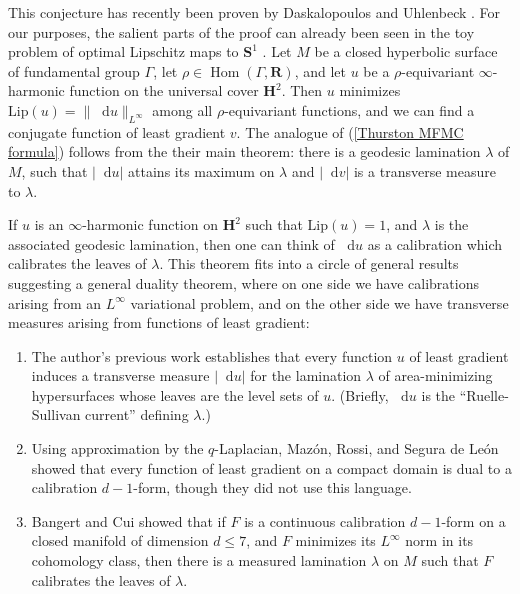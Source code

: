 \documentclass[reqno,11pt]{amsart}
\newcommand{\RR}{\mathbf{R}}
\newcommand{\Hyp}{\mathbf H}
\newcommand{\Sph}{\mathbf S}
\newcommand*\dif{\mathop{}\!\mathrm{d}}
\DeclareMathOperator{\Hom}{Hom}
\newcommand{\Lip}{\mathrm{Lip}}
\theoremstyle{definition}
\numberwithin{equation}{section}
\begin{document}
This conjecture has recently been proven by Daskalopoulos and Uhlenbeck \cite{daskalopoulos2022,uhlenbeck2023noether,daskalopoulos2023}.
For our purposes, the salient parts of the proof can already been seen in the toy problem of optimal Lipschitz maps to $\Sph^1$ \cite{daskalopoulos2020transverse}.
Let $M$ be a closed hyperbolic surface of fundamental group $\Gamma$, let $\rho \in \Hom(\Gamma, \RR)$, and let $u$ be a $\rho$-equivariant $\infty$-harmonic function on the universal cover $\Hyp^2$.
Then $u$ minimizes $\Lip(u) = \|\dif u\|_{L^\infty}$ among all $\rho$-equivariant functions, and we can find a conjugate function of least gradient $v$.
The analogue of (\ref{Thurston MFMC formula}) follows from the their main theorem: there is a geodesic lamination $\lambda$ of $M$, such that $|\dif u|$ attains its maximum on $\lambda$ and $|\dif v|$ is a transverse measure to $\lambda$.

If $u$ is an $\infty$-harmonic function on $\Hyp^2$ such that $\Lip(u) = 1$, and $\lambda$ is the associated geodesic lamination, then one can think of $\dif u$ as a calibration which calibrates the leaves of $\lambda$.
This theorem fits into a circle of general results suggesting a general duality theorem, where on one side we have calibrations arising from an $L^\infty$ variational problem, and on the other side we have transverse measures arising from functions of least gradient:
\begin{enumerate}
\item The author's previous work \cite{BackusCML} establishes that every function $u$ of least gradient induces a transverse measure $|\dif u|$ for the lamination $\lambda$ of area-minimizing hypersurfaces whose leaves are the level sets of $u$.
(Briefly, $\dif u$ is the ``Ruelle-Sullivan current'' defining $\lambda$.)
\item Using approximation by the $q$-Laplacian, Maz\'on, Rossi, and Segura de Le\'on \cite{Mazon14} showed that every function of least gradient on a compact domain is dual to a calibration $d - 1$-form, though they did not use this language.
\item Bangert and Cui \cite{bangert_cui_2017} showed that if $F$ is a continuous calibration $d - 1$-form on a closed manifold of dimension $d \leq 7$, and $F$ minimizes its $L^\infty$ norm in its cohomology class, then there is a measured lamination $\lambda$ on $M$ such that $F$ calibrates the leaves of $\lambda$.
\end{enumerate}
\end{document}
